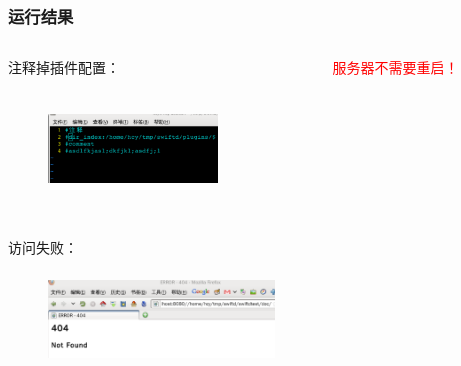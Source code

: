 \documentclass[10pt,dvipdfm]{beamer}
\begin{document}
\begin{frame}
	\frametitle{运行结果}
	\begin{columns}
		\begin{column}{0.6\textwidth}
			\begin{block}{注释掉插件配置：}
			\begin{figure}[htbp]
			\centering
			\includegraphics[height=3cm, width=4.5cm]{pics/complugin.eps}
			\end{figure}
			\end{block}
		\end{column}
		
		\begin{column}{0.3\textwidth}
			\textcolor{red}{服务器不需要重启！}
		\end{column}
	\end{columns}
	
	\begin{block}{访问失败：}
	\begin{figure}[htbp]
	\centering
	\includegraphics[height=2.5cm, width=6cm]{pics/nodirindex.eps}
	\end{figure}
	\end{block}
\end{frame}
\end{document}
